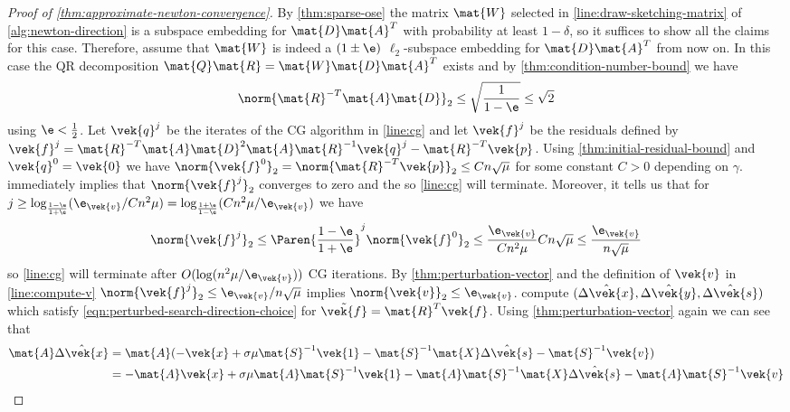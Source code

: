 \begin{proof}[Proof of \cref{thm:approximate-newton-convergence}]
  By \cref{thm:sparse-ose} the matrix \(\mat{W}\) selected in \cref{line:draw-sketching-matrix} of \cref{alg:newton-direction} is a subspace embedding for \(\mat{D}\mat{A}^T\) with probability at least \(1 - \delta\), so it suffices to show all the claims for this case.
  Therefore, assume that \(\mat{W}\) is indeed a \((1 \pm \e)\) \(\ell_2\)-subspace embedding for \(\mat{D}\mat{A}^T\) from now on.
  In this case the QR decomposition \(\mat{Q}\mat{R} = \mat{W}\mat{D}\mat{A}^T\) exists and by \cref{thm:condition-number-bound} we have
  \[\norm{\mat{R}^{-T}\mat{A}\mat{D}}_2 \leq \sqrt{\frac{1}{1 - \e}} \leq \sqrt{2}\]
  using \(\e < \frac{1}{2}\).
  Let \(\vek{q}^j\) be the iterates of the CG algorithm in \cref{line:cg} and let \(\vek{f}^j\) be the residuals defined by
\( \vek{f}^j = \mat{R}^{-T} \mat{A} \mat{D}^2 \mat{A} \mat{R}^{-1} \vek{q}^j - \mat{R}^{-T} \vek{p} \).
  Using \cref{thm:initial-residual-bound} and \(\vek{q}^0 = \vek{0}\) we have \(\norm{\vek{f}^0}_2 = \norm{\mat{R}^{-T} \vek{p}}_2 \leq Cn\sqrt{\mu}\) for some constant \(C > 0\) depending on \(\gamma\).
   immediately implies that \(\norm{\vek{f}^j}_2\) converges to zero and the so \cref{line:cg} will terminate.
  Moreover, it tells us that for \(j \geq \log_{\frac{1 - \e}{1 + \e}}(\e_{\vek{v}}/C n^2 \mu) = \log_{\frac{1 + \e}{1 - \e}}(C n^2 \mu / \e_{\vek{v}})\) we have
  \[ \norm{\vek{f}^j}_2 \leq \Paren{\frac{1 - \e}{1 + \e}}^j \norm{\vek{f}^0}_2 \leq \frac{\e_{\vek{v}}}{C n^2 \mu} C n \sqrt{\mu} \leq \frac{\e_{\vek{v}}}{n \sqrt{\mu}} \]
  so \cref{line:cg} will terminate after \(O(\log(n^2 \mu / \e_{\vek{v}}))\) CG iterations.
  By \cref{thm:perturbation-vector} and the definition of \(\vek{v}\) in \cref{line:compute-v} \(\norm{\vek{f}^j}_2 \leq \e_{\vek{v}}/n\sqrt{\mu}\) implies \(\norm{\vek{v}}_2 \leq \e_{\vek{v}}\).
   compute \((\hat{\Delta\vek{x}}, \hat{\Delta\vek{y}}, \hat{\Delta\vek{s}})\) which satisfy \cref{eqn:perturbed-search-direction-choice} for \(\tilde{\vek{f}} = \mat{R}^T \vek{f}\).
  Using \cref{thm:perturbation-vector} again we can see that
  \begin{align*}
    \mat{A}\hat{\Delta\vek{x}} 
    &= \mat{A} (-\vek{x} + \sigma \mu \mat{S}^{-1}\vek{1} - \mat{S}^{-1}\mat{X}\hat{\Delta\vek{s}} - \mat{S}^{-1}\vek{v}) \\
    &= -\mat{A}\vek{x} + \sigma \mu \mat{A}\mat{S}^{-1}\vek{1} - \mat{A}\mat{S}^{-1}\mat{X}\hat{\Delta\vek{s}} - \mat{A}\mat{S}^{-1}\vek{v} \\

\end{align*}
\end{proof}
